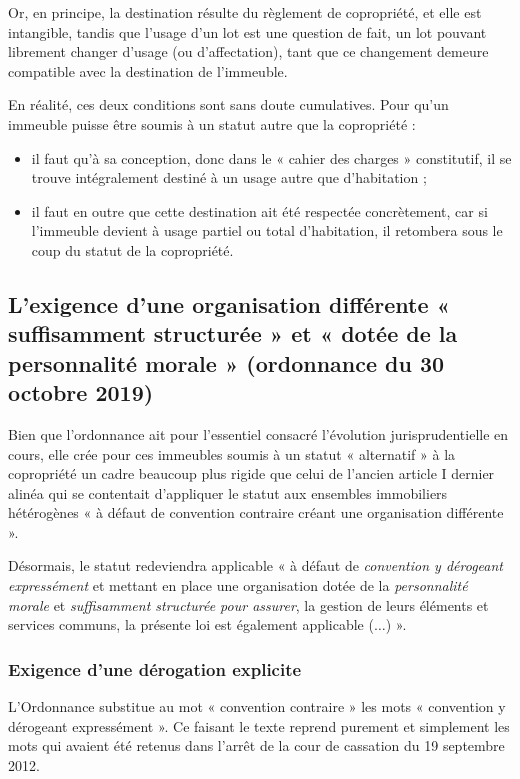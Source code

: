 		Or, en principe, la destination résulte du règlement de copropriété, et elle est intangible, tandis que l’usage
		d’un lot est une question de fait, un lot pouvant librement changer d’usage (ou d’affectation), tant que ce
		changement demeure compatible avec la destination de l’immeuble.
		
		En réalité, ces deux conditions sont sans doute cumulatives. Pour qu’un immeuble puisse être soumis à un
		statut autre que la copropriété :
		\begin{itemize}
			\item il faut qu’à sa conception, donc dans le « cahier des charges » constitutif, il se trouve
				intégralement destiné à un usage autre que d’habitation ;
			\item il faut en outre que cette destination ait été respectée concrètement, car si l’immeuble devient
				à usage partiel ou total d’habitation, il retombera sous le coup du statut de la copropriété.
		\end{itemize}
	
	\subsection{L’exigence d’une organisation différente « suffisamment structurée » et « dotée de la personnalité morale » (ordonnance du 30 octobre 2019)}
		Bien que l’ordonnance ait pour l’essentiel consacré l’évolution jurisprudentielle en cours, elle crée pour
		ces immeubles soumis à un statut « alternatif » à la copropriété un cadre beaucoup plus rigide que celui
		de l’ancien article I dernier alinéa qui se contentait d’appliquer le statut aux ensembles immobiliers
		hétérogènes « à défaut de convention contraire créant une organisation différente ».
		
		Désormais, le statut redeviendra applicable « à défaut de \emph{convention y dérogeant expressément} et mettant
		en place une organisation dotée de la \emph{personnalité morale} et \emph{suffisamment structurée pour assurer}, la
		gestion de leurs éléments et services communs, la présente loi est également applicable ($\dots$) ».
		
		\subsubsection{Exigence d’une dérogation explicite}
			L’Ordonnance substitue au mot « convention contraire » les mots « convention y dérogeant
			expressément ». Ce faisant le texte reprend purement et simplement les mots qui avaient été retenus
			dans l’arrêt de la cour de cassation du 19 septembre 2012.
			

